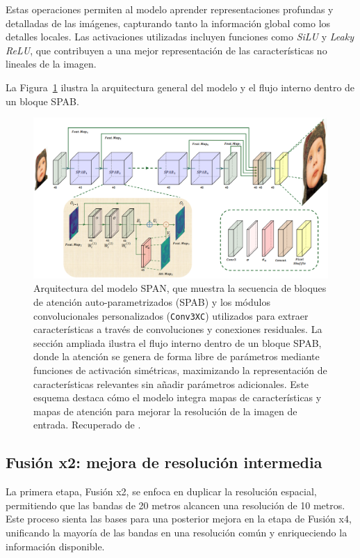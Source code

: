             Estas operaciones permiten al modelo aprender representaciones profundas y detalladas de las imágenes, capturando tanto la información global como los detalles locales. Las activaciones utilizadas incluyen funciones como \textit{SiLU} y \textit{Leaky ReLU}, que contribuyen a una mejor representación de las características no lineales de la imagen.

            La Figura~\ref{fig:span} ilustra la arquitectura general del modelo y el flujo interno dentro de un bloque SPAB.

            \begin{figure}[H]
                \centering
                \includegraphics[width=1\linewidth]{images/span.png}
                \caption{Arquitectura del modelo SPAN, que muestra la secuencia de bloques de atención auto-parametrizados (SPAB) y los módulos convolucionales personalizados (\texttt{Conv3XC}) utilizados para extraer características a través de convoluciones y conexiones residuales. La sección ampliada ilustra el flujo interno dentro de un bloque SPAB, donde la atención se genera de forma libre de parámetros mediante funciones de activación simétricas, maximizando la representación de características relevantes sin añadir parámetros adicionales. Este esquema destaca cómo el modelo integra mapas de características y mapas de atención para mejorar la resolución de la imagen de entrada. Recuperado de \textcite{wan2024swiftparameterfreeattentionnetwork}.}
                \label{fig:span}
            \end{figure}


    \subsection{Fusión x2: mejora de resolución intermedia}

        La primera etapa, Fusión x2, se enfoca en duplicar la resolución espacial, permitiendo que las bandas de 20 metros alcancen una resolución de 10 metros. Este proceso sienta las bases para una posterior mejora en la etapa de Fusión x4, unificando la mayoría de las bandas en una resolución común y enriqueciendo la información disponible.

